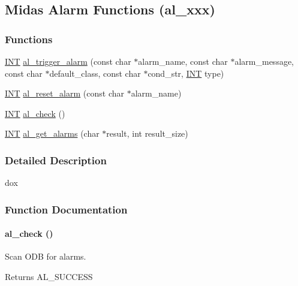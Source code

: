 \subsection{Midas Alarm Functions (al\_\-xxx)}
\label{group__alfunctioncode}
\subsubsection*{Functions}
\begin{DoxyCompactItemize}
\item 
\hyperlink{vppg_8h_a392e62da233ed3e2f7c3fd4f487a3896}{INT} \hyperlink{group__alfunctioncode_gac024cd8160dc8b9418f05a63678f6c68}{al\_\-trigger\_\-alarm} (const char $\ast$alarm\_\-name, const char $\ast$alarm\_\-message, const char $\ast$default\_\-class, const char $\ast$cond\_\-str, \hyperlink{vppg_8h_a392e62da233ed3e2f7c3fd4f487a3896}{INT} type)
\item 
\hyperlink{vppg_8h_a392e62da233ed3e2f7c3fd4f487a3896}{INT} \hyperlink{group__alfunctioncode_gab555780bdb676810330f6a7cbbeaaf30}{al\_\-reset\_\-alarm} (const char $\ast$alarm\_\-name)
\item 
\hyperlink{vppg_8h_a392e62da233ed3e2f7c3fd4f487a3896}{INT} \hyperlink{group__alfunctioncode_gaf31864a8bc5fe779057e81bde12167a9}{al\_\-check} ()
\item 
\hyperlink{vppg_8h_a392e62da233ed3e2f7c3fd4f487a3896}{INT} \hyperlink{group__alfunctioncode_gabe1fa087b5c911dae39042bc768bf9c8}{al\_\-get\_\-alarms} (char $\ast$result, int result\_\-size)
\end{DoxyCompactItemize}


\subsubsection{Detailed Description}
dox 

\subsubsection{Function Documentation}
\paragraph[{al\_\-check}]{ al\_\-check ()}\hfill\label{group__alfunctioncode_gaf31864a8bc5fe779057e81bde12167a9}
Scan ODB for alarms. \begin{DoxyReturn}{Returns}
AL\_\-SUCCESS 
\end{DoxyReturn}


